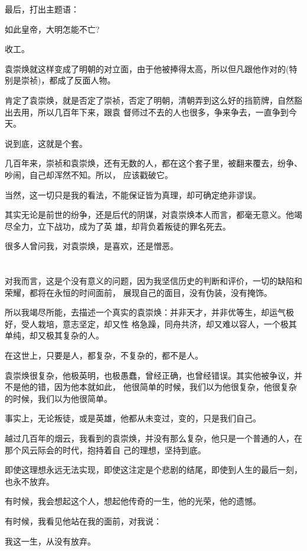 \documentclass[11pt,a4paper,onecolumn]{article}
\begin{document}
最后，打出主题语：

如此皇帝，大明怎能不亡?

收工。

袁崇焕就这样变成了明朝的对立面，由于他被捧得太高，所以但凡跟他作对的(特别是崇祯)，都成了反面人物。

肯定了袁崇焕，就是否定了崇祯，否定了明朝，清朝弄到这么好的挡箭牌，自然豁出去用，所以几百年下来，跟袁
督师过不去的人也很多，争来争去，一直争到今天。

说到底，这就是个套。

几百年来，崇祯和袁崇焕，还有无数的人，都在这个套子里，被翻来覆去，纷争、吵闹，自己却浑然不知。所以，
应该戳破它。

当然，这一切只是我的看法，不能保证皆为真理，却可确定绝非谬误。

其实无论是前世的纷争，还是后代的阴谋，对袁崇焕本人而言，都毫无意义。他竭尽全力，立下战功，成为了英
雄，却背负着叛徒的罪名死去。

很多人曾问我，对袁崇焕，是喜欢，还是憎恶。

\section[\thesection]{}

对我而言，这是个没有意义的问题，因为我坚信历史的判断和评价，一切的缺陷和荣耀，都将在永恒的时间面前，
展现自己的面目，没有伪装，没有掩饰。

所以我竭尽所能，去描述一个真实的袁崇焕：并非天才，并非优等生，却运气极好，受人栽培，意志坚定，却又性
格急躁，同舟共济，却又难以容人，一个极其单纯，却又极其复杂的人。

在这世上，只要是人，都复杂，不复杂的，都不是人。

袁崇焕很复杂，他极英明，也极愚蠢，曾经正确，也曾经错误。其实他被争议，并不是他的错，因为他本就如此，
他很简单的时候，我们以为他很复杂，他很复杂的时候，我们以为他很简单。

事实上，无论叛徒，或是英雄，他都从未变过，变的，只是我们自己。

越过几百年的烟云，我看到的袁崇焕，并没有那么复杂，他只是一个普通的人，在那个风云际会的时代，抱持着自
己的理想，坚持到底。

即使这理想永远无法实现，即使这注定是个悲剧的结尾，即使到人生的最后一刻，也永不放弃。

有时候，我会想起这个人，想起他传奇的一生，他的光荣，他的遗憾。

有时候，我看见他站在我的面前，对我说：

我这一生，从没有放弃。
\end{document}
